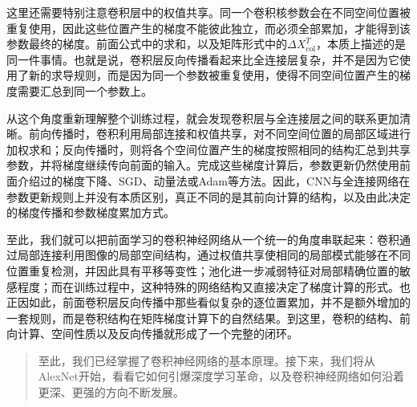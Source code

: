这里还需要特别注意卷积层中的权值共享。同一个卷积核参数会在不同空间位置被重复使用，因此这些位置产生的梯度不能彼此独立，而必须全部累加，才能得到该参数最终的梯度。前面公式中的求和，以及矩阵形式中的$\Delta X_{\mathrm{col}}^T$，本质上描述的是同一件事情。也就是说，卷积层反向传播看起来比全连接层复杂，并不是因为它使用了新的求导规则，而是因为同一个参数被重复使用，使得不同空间位置产生的梯度需要汇总到同一个参数上。

从这个角度重新理解整个训练过程，就会发现卷积层与全连接层之间的联系更加清晰。前向传播时，卷积利用局部连接和权值共享，对不同空间位置的局部区域进行加权求和；反向传播时，则将各个空间位置产生的梯度按照相同的结构汇总到共享参数，并将梯度继续传向前面的输入。完成这些梯度计算后，参数更新仍然使用前面介绍过的梯度下降、SGD、动量法或Adam等方法。因此，CNN与全连接网络在参数更新规则上并没有本质区别，真正不同的是其前向计算的结构，以及由此决定的梯度传播和参数梯度累加方式。

至此，我们就可以把前面学习的卷积神经网络从一个统一的角度串联起来：卷积通过局部连接利用图像的局部空间结构，通过权值共享使相同的局部模式能够在不同位置重复检测，并因此具有平移等变性；池化进一步减弱特征对局部精确位置的敏感程度；而在训练过程中，这种特殊的网络结构又直接决定了梯度计算的形式。也正因如此，前面卷积层反向传播中那些看似复杂的逐位置累加，并不是额外增加的一套规则，而是卷积结构在矩阵梯度计算下的自然结果。到这里，卷积的结构、前向计算、空间性质以及反向传播就形成了一个完整的闭环。

\begin{quote}
    至此，我们已经掌握了卷积神经网络的基本原理。接下来，我们将从AlexNet开始，看看它如何引爆深度学习革命，以及卷积神经网络如何沿着更深、更强的方向不断发展。
\end{quote}